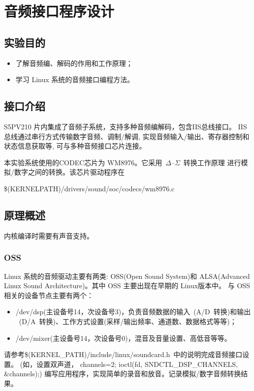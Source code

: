 \chapter{音频接口程序设计}

\section{实验目的}
\begin{itemize}\itemsep=-3pt
  \item 了解音频编、解码的作用和工作原理；
  \item 学习 Linux 系统的音频接口编程方法。
\end{itemize}

\section{接口介绍}
	S5PV210 片内集成了音频子系统，支持多种音频编解码，包含IIS总线接口。
IIS总线通过串行方式传输数字音频、调制/解调, 实现音频输入/输出、寄存器控制和
状态信息获取等, 可与多种音频接口芯片连接。

	本实验系统使用的CODEC芯片为 WM8976。它采用~$\Delta$--$\Sigma$~转换工作原理
进行模拟/数字之间的转换。该芯片驱动程序在

  \$(KERNELPATH)/drivers/sound/soc/codecs/wm8976.c

\section{原理概述}
	内核编译时需要有声音支持。

\subsection{OSS}
	Linux 系统的音频驱动主要有两类: OSS(Open Sound System)和 ALSA(Advanced
Linux Sound Architecture)。其中 OSS 主要出现在早期的 Linux版本中。
与 OSS 相关的设备节点主要有两个：

\begin{itemize}\itemsep=-3pt
  \item /dev/dsp(主设备号14，次设备号3)，负责音频数据的输入~(A/D~转换)和输出
		~(D/A~转换)、工作方式设置(采样/输出频率、通道数、数据格式等等)；
  \item /dev/mixer(主设备号14，次设备号0)，混音及音量设置、高低音等等。
\end{itemize}

	请参考\$(KERNEL\_PATH)/include/linux/soundcard.h~中的说明完成音频接口设置。
(如，设置双声道， channels=2; ioctl(fd, SNDCTL\_DSP\_CHANNELS, \&channels);)
编写应用程序，实现简单的录音和放音。记录模拟/数字音频转换结果。


